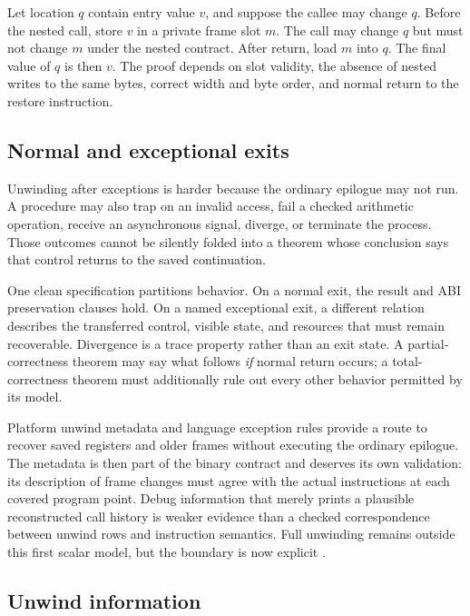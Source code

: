 \begin{proofkit}[title={Preservation by save, call, and restore}]
Let location \(q\) contain entry value \(v\), and suppose the callee may change
\(q\). Before the nested call, store \(v\) in a private frame slot \(m\). The
call may change \(q\) but must not change \(m\) under the nested contract.
After return, load \(m\) into \(q\). The final value of \(q\) is then \(v\).
The proof depends on slot validity, the absence of nested writes to the same
bytes, correct
width and byte order, and normal return to the restore instruction.
\end{proofkit}

\subsection{Normal and exceptional exits}

Unwinding after exceptions is harder because the ordinary epilogue may not
run. A procedure may also trap on an invalid access, fail a checked arithmetic
operation, receive an asynchronous signal, diverge, or terminate the process.
Those outcomes cannot be silently folded into a theorem whose conclusion says
that control returns to the saved continuation.

One clean specification partitions behavior. On a normal exit, the result and
ABI preservation clauses hold. On a named exceptional exit, a different
relation describes the transferred control, visible state, and resources that
must remain recoverable. Divergence is a trace property rather than an exit
state. A partial-correctness theorem may say what follows \emph{if} normal
return occurs; a total-correctness theorem must additionally rule out every
other behavior permitted by its model.

Platform unwind metadata and language exception rules provide a route to
recover saved registers and older frames without executing the ordinary
epilogue. The metadata is then part of the binary contract and deserves its
own validation: its description of frame changes must agree with the actual
instructions at each covered program point. Debug information that merely
prints a plausible reconstructed call history is weaker evidence than a checked correspondence
between unwind rows and instruction semantics. Full unwinding remains outside
this first scalar model, but the boundary is now explicit
\autocite{dwarf2017v5}.

\subsection{Unwind information}

